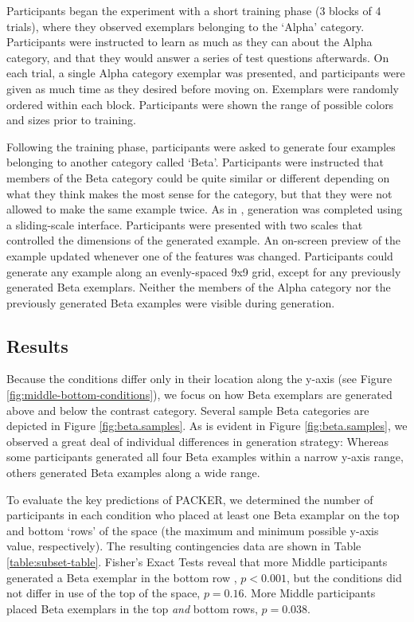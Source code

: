 \documentclass[10pt,letterpaper]{article}
\begin{document}
Participants began the experiment with a short training phase (3 blocks of 4 trials), where they observed exemplars belonging to the `Alpha' category. Participants were instructed to learn as much as they can about the Alpha category, and that they would answer a series of test questions afterwards. On each trial, a single Alpha category exemplar was presented, and participants were given as much time as they desired before moving on. Exemplars were randomly ordered within each block. Participants were shown the range of possible colors and sizes prior to training.

Following the training phase, participants were asked to generate four examples belonging to another category called `Beta'. Participants were instructed that members of the Beta category could be quite similar or different depending on what they think makes the most sense for the category, but that they were not allowed to make the same example twice. As in \citet{jern2013probabilistic}, generation was completed using a sliding-scale interface. Participants were presented with two scales that controlled the dimensions of the generated example. An on-screen preview of the example updated whenever one of the features was changed. Participants could generate any example along an evenly-spaced 9x9 grid, except for any previously generated Beta exemplars. Neither the members of the Alpha category nor the previously generated Beta examples were visible during generation. 

\subsection{Results}

Because the conditions differ only in their location along the y-axis (see Figure \ref{fig:middle-bottom-conditions}), we focus on how Beta exemplars are generated above and below the contrast category. Several sample Beta categories are depicted in Figure \ref{fig:beta.samples}. As is evident in Figure \ref{fig:beta.samples}, we observed a great deal of individual differences in generation strategy: Whereas some participants generated all four Beta examples within a narrow y-axis range, others generated Beta examples along a wide range. 

To evaluate the key predictions of PACKER, we determined the number of participants in each condition who placed at least one Beta examplar on the top and bottom `rows' of the space (the maximum and minimum possible y-axis value, respectively). The resulting contingencies data are shown in Table \ref{table:subset-table}. Fisher's Exact Tests reveal that more Middle participants generated a Beta exemplar in the bottom row , $p < 0.001$, but the conditions did not differ in use of the top of the space, $p = 0.16$. More Middle participants placed Beta exemplars in the top \textit{and} bottom rows, $p = 0.038$. 
\end{document}
